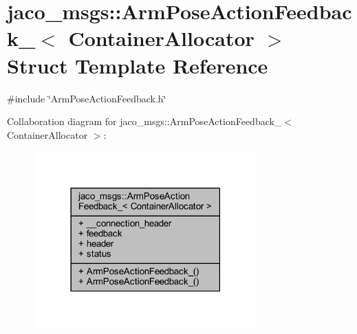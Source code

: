 \hypertarget{structjaco__msgs_1_1ArmPoseActionFeedback__}{}\section{jaco\+\_\+msgs\+:\+:Arm\+Pose\+Action\+Feedback\+\_\+$<$ Container\+Allocator $>$ Struct Template Reference}
\label{structjaco__msgs_1_1ArmPoseActionFeedback__}


{\ttfamily \#include \char`\"{}Arm\+Pose\+Action\+Feedback.\+h\char`\"{}}



Collaboration diagram for jaco\+\_\+msgs\+:\+:Arm\+Pose\+Action\+Feedback\+\_\+$<$ Container\+Allocator $>$\+:
\nopagebreak
\begin{figure}[H]
\begin{center}
\leavevmode
\includegraphics[width=242pt]{d4/d8e/structjaco__msgs_1_1ArmPoseActionFeedback____coll__graph}
\end{center}
\end{figure}
